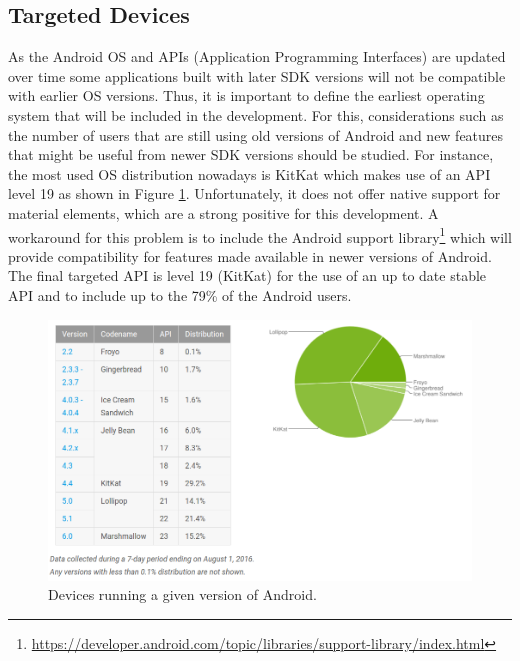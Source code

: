 \subsection{Targeted Devices}
As the Android OS and APIs (Application Programming Interfaces) are updated over time some applications built with later SDK versions will not be compatible with earlier OS versions. Thus, it is important to define the earliest operating system that will be included in the development. For this, considerations such as the number of users that are still using old versions of Android and new features that might be useful from newer SDK versions should be studied. For instance, the most used OS distribution nowadays is KitKat which makes use of an API level 19 as shown in Figure \ref{fig:android_platform_versions}.  Unfortunately, it does not offer native support for material elements, which are a strong positive for this development. A workaround for this problem is to include the Android support library\footnote{\url{https://developer.android.com/topic/libraries/support-library/index.html}} which will provide compatibility for features made available in newer versions of Android. The final targeted API is level 19 (KitKat) for the use of an up to date stable API and to include up to the 79\% of the Android users.  

\begin{figure}[H]
\begin{adjustbox}{width=1\textwidth,center=\textwidth}
  \centering
  \includegraphics[scale=1]{images/android_platform_versions.png}
\end{adjustbox}
  \caption[Devices running a given version of Android]{Devices running a given version of Android.\footnotemark}
  \label{fig:android_platform_versions}
\end{figure}

